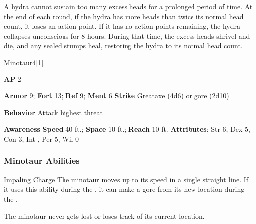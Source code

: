 A hydra cannot sustain too many excess heads for a prolonged period of time.
At the end of each round, if the hydra has more heads than twice its normal head count, it loses an action point.
If it has no action points remaining, the hydra collapses unconscious for 8 hours.
During that time, the excess heads shrivel and die, and any sealed stumps heal, restoring the hydra to its normal head count.

\begin{monsection}{Minotaur}{4}[1]
\vspace{-1em}\vspace{-1em}
\begin{spellcontent}
\begin{spelltargetinginfo}
{\textbf{AP} 2}

\pari \textbf{Armor} 9;
\textbf{Fort} 13;
\textbf{Ref} 9;
\textbf{Ment} 6
\pari \textbf{Strike} Greataxe  (4d6) or gore  (2d10)



\pari \textbf{Behavior} Attack highest threat
\end{spelltargetinginfo}
\end{spellcontent}

\begin{monsterfooter}
\pari \textbf{Awareness} 
\pari \textbf{Speed} 40 ft.;
\textbf{Space} 10 ft.;
\textbf{Reach} 10 ft.
\pari \textbf{Attributes}:
Str 6,
Dex 5,
Con 3,
Int ,
Per 5,
Wil 0
\end{monsterfooter}
\end{monsection}


\subsubsection{Minotaur Abilities}

\begin{freeability}{Impaling Charge}
The minotaur moves up to its speed in a single straight line.
If it uses this ability during the , it can make a gore  from its new location during the .
\end{freeability}

The minotaur never gets lost or loses track of its current location.

